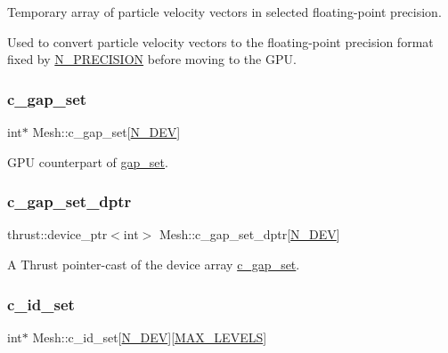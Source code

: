Temporary array of particle velocity vectors in selected floating-\/point precision. 

Used to convert particle velocity vectors to the floating-\/point precision format fixed by \hyperlink{cppspec_8h_a471e2491cf3df4197fe5b39387103e8e}{N\+\_\+\+P\+R\+E\+C\+I\+S\+I\+ON} before moving to the G\+PU. \mbox{\label{classMesh_a34f413b39ee5010f0bd8ddb271c25064}} 
\subsubsection{\texorpdfstring{c\+\_\+gap\+\_\+set}{c\_gap\_set}}
{\footnotesize\ttfamily int$\ast$ Mesh\+::c\+\_\+gap\+\_\+set\mbox{[}\hyperlink{cppspec_8h_a2b674dab7a14f1bf32b48b7fda5022dc}{N\+\_\+\+D\+EV}\mbox{]}}



G\+PU counterpart of \hyperlink{classMesh_ac93e6c7bad14ea20def3e3464a261322}{gap\+\_\+set}. 

\mbox{\label{classMesh_a61c0adf36d6b29b65d1b1ffdb2b43568}} 
\subsubsection{\texorpdfstring{c\+\_\+gap\+\_\+set\+\_\+dptr}{c\_gap\_set\_dptr}}
{\footnotesize\ttfamily thrust\+::device\+\_\+ptr$<$int$>$ Mesh\+::c\+\_\+gap\+\_\+set\+\_\+dptr\mbox{[}\hyperlink{cppspec_8h_a2b674dab7a14f1bf32b48b7fda5022dc}{N\+\_\+\+D\+EV}\mbox{]}}



A Thrust pointer-\/cast of the device array \hyperlink{classMesh_a34f413b39ee5010f0bd8ddb271c25064}{c\+\_\+gap\+\_\+set}. 

\mbox{\label{classMesh_ae4bc3c2c0013415db58fa77623b21ca5}} 
\subsubsection{\texorpdfstring{c\+\_\+id\+\_\+set}{c\_id\_set}}
{\footnotesize\ttfamily int$\ast$ Mesh\+::c\+\_\+id\+\_\+set\mbox{[}\hyperlink{cppspec_8h_a2b674dab7a14f1bf32b48b7fda5022dc}{N\+\_\+\+D\+EV}\mbox{]}\mbox{[}\hyperlink{cppspec_8h_add784659439a8dd6b1423406171414d3}{M\+A\+X\+\_\+\+L\+E\+V\+E\+LS}\mbox{]}}



